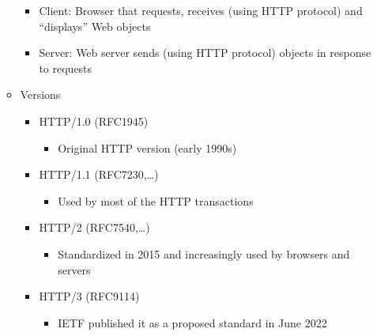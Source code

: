 \begin{itemize}
\begin{itemize}
\begin{itemize}
          \item Client: Browser that requests, receives (using HTTP protocol) and ``displays'' Web objects

          \item Server: Web server sends (using HTTP protocol) objects in response to requests

        \end{itemize}

      \item Versions

        \begin{itemize}

          \item HTTP/1.0 (RFC1945)

            \begin{itemize}

              \item Original HTTP version (early 1990s)

            \end{itemize}

          \item HTTP/1.1 (RFC7230,\ldots)

            \begin{itemize}

              \item Used by most of the HTTP transactions

            \end{itemize}

          \item HTTP/2 (RFC7540,\ldots)

            \begin{itemize}

              \item Standardized in 2015 and increasingly used by browsers and servers

            \end{itemize}

          \item HTTP/3 (RFC9114)

            \begin{itemize}

              \item IETF published it as a proposed standard in June 2022

            \end{itemize}


\end{itemize}
\end{itemize}
\end{itemize}
